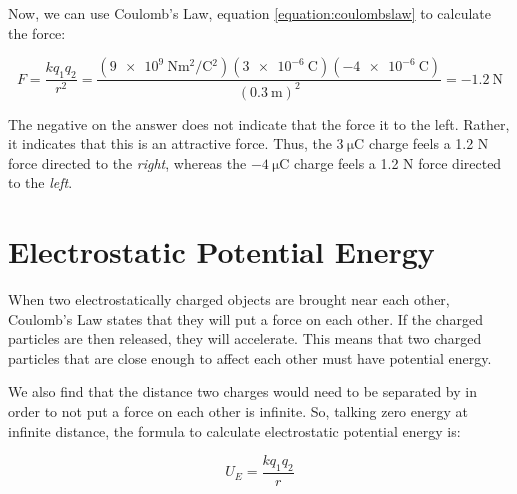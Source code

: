 \begin{mdframed}[backgroundcolor=blue!10!white]
		Now, we can use Coulomb's Law, equation \ref{equation:coulombslaw} to calculate the force:
		
			\begin{equation*}
		F = \frac{kq_1q_2}{r^2} = \frac{(\SI{9e9}{\N\m^2\per\coulomb^2})(\SI{3e-6}{\coulomb})(\SI{-4e-6}{\coulomb})}{(\SI{0.3}{\m})^2} = \boxed{\SI{-1.2}{\N}}
		\end{equation*}
		
		The negative on the answer does not indicate that the force it to the left.  Rather, it indicates that this is an attractive force.  Thus, the $\SI{3}{\micro\coulomb}$ charge feels a 1.2 N force directed to the \textit{right}, whereas the $\SI{-4}{\micro\coulomb}$ charge feels a 1.2 N force directed to the \textit{left}.
		
	\end{mdframed}
	
	
	
	
	
	
	\section{Electrostatic Potential Energy}
	
	When two electrostatically charged objects are brought near each other, Coulomb's Law states that they will put a force on each other.  If the charged particles are then released, they will accelerate.  This means that two charged particles that are close enough to affect each other must have potential energy.  
	
	We also find that the distance two charges would need to be separated by in order to not put a force on each other is infinite.  So, talking zero energy at infinite distance, the formula to calculate electrostatic potential energy is:
		
	\begin{mdframed}[backgroundcolor=orange!20!white]
		
		\begin{equation}
		U_E = \frac{kq_1q_2}{r}
		\label{equation:electrostaticpotentialenergy}
		\end{equation}
	\end{mdframed}	
	

